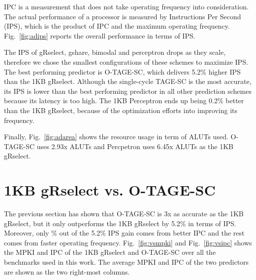 IPC is a measurement that does not take operating frequency into consideration. The actual performance of a processor is measured by Instructions Per Second (IPS), which is the product of IPC and the maximum operating frequency. Fig.~\ref{fig:adips} reports the overall performance in terms of IPS.

The IPS of gRselect, gshare, bimodal and perceptron drops as they scale, therefore we chose the smallest configurations of these schemes to maximize IPS. The best performing predictor is \mbox{O-TAGE-SC}, which delivers 5.2\% higher IPS than the 1KB gRselect. Although the single-cycle \mbox{TAGE-SC} is the most accurate, its IPS is lower than the best performing predictor in all other prediction schemes  because its latency is too high. The 1KB Perceptron ends up being 0.2\% better than the 1KB gRselect, because of the optimization efforts into improving its frequency. 

Finally, Fig.~\ref{fig:adarea} shows the resource usage in term of ALUTs used. \mbox{O-TAGE-SC} uses 2.93x ALUTs and Percpetron uses 6.45x ALUTs as the 1KB gRselect.

\section{1KB gRselect vs. O-TAGE-SC}
\label{sec:eval:vs}
The previous section has shown that \mbox{O-TAGE-SC} is \mytilde 3x as accurate as the 1KB gRselect, but it only outperforms the 1KB gRselect by 5.2\% in terms of IPS. Moreover, only \% out of the 5.2\% IPS gain comes from better IPC and the rest comes from faster operating frequency. Fig.~\ref{fig:vsmpki} and Fig.~\ref{fig:vsipc} shows the MPKI and IPC of the 1KB gRselect and \mbox{O-TAGE-SC} over all the benchmarks used in this work. The average MPKI and IPC of the two predictors are shown as the two right-most columns.



